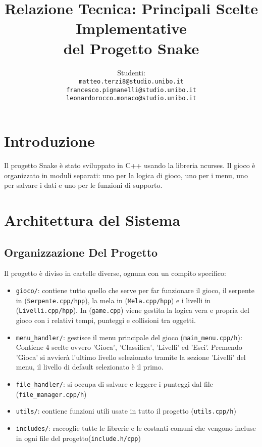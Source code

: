 \documentclass[a4paper,12pt]{article}
\title{Relazione Tecnica: Principali Scelte Implementative\\del Progetto Snake}
\author{Studenti:\\ 
\texttt{matteo.terzi8@studio.unibo.it}\\ 
\texttt{francesco.pignanelli@studio.unibo.it}\\ 
\texttt{leonardorocco.monaco@studio.unibo.it}
}
\date{}
\begin{document}
\sloppy

\maketitle

\section{Introduzione}

Il progetto Snake è stato sviluppato in C++ usando la libreria ncurses. Il gioco è organizzato in moduli separati: uno per la logica di gioco, uno per i menu, uno per salvare i dati e uno per le funzioni di supporto.

\section{Architettura del Sistema}

\subsection{Organizzazione Del Progetto}

Il progetto è diviso in cartelle diverse, ognuna con un compito specifico:

\begin{itemize}
    \item \texttt{gioco/}: contiene tutto quello che serve per far funzionare il gioco, il serpente in (\texttt{Serpente.cpp/hpp}), la mela in (\texttt{Mela.cpp/hpp}) e i livelli in (\texttt{Livelli.cpp/hpp}). In (\texttt{game.cpp}) viene gestita la logica vera e propria del gioco con i relativi tempi, punteggi e collisioni tra oggetti.
    
    \item \texttt{menu\_handler/}: gestisce il menu principale del gioco (\texttt{main\_menu.cpp/h}): Contiene 4 scelte ovvero 'Gioca', 'Classifica', 'Livelli' ed 'Esci'. Premendo 'Gioca' si avvierà l'ultimo livello selezionato tramite la sezione 'Livelli' del menu, il livello di default selezionato è il primo.
    
    \item \texttt{file\_handler/}: si occupa di salvare e leggere i punteggi dal file (\texttt{file\_manager.cpp/h})
    
    \item \texttt{utils/}: contiene funzioni utili usate in tutto il progetto (\texttt{utils.cpp/h})
    \item \texttt{includes/}: raccoglie tutte le librerie e le costanti comuni che vengono incluse in ogni file del progetto(\texttt{include.h/cpp})
\end{itemize}
\end{document}

